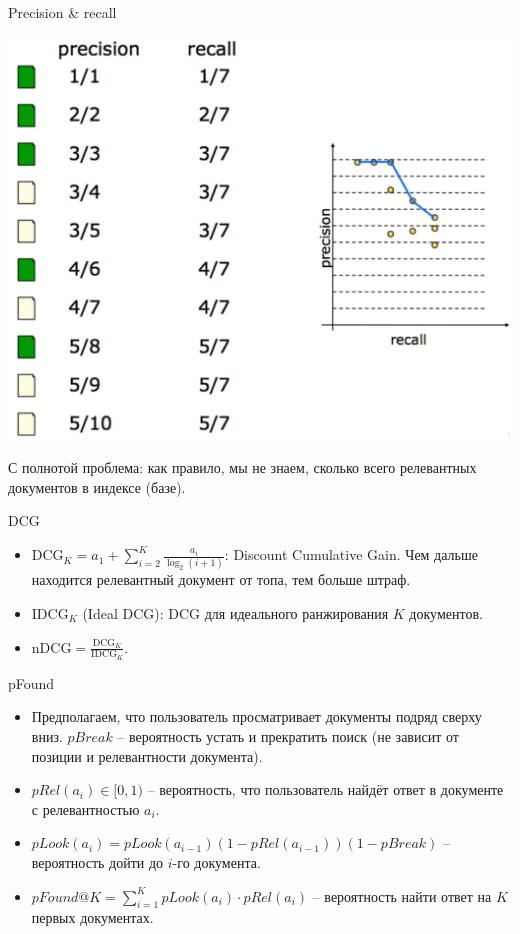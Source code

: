 \documentclass[9pt]{beamer}
\begin{document}
\begin{frame}{Precision \& recall}
\begin{center}
    \includegraphics[height=0.7\textheight]{img/ranking_precision_recall.jpg}
\end{center}
С полнотой проблема: как правило, мы не знаем, сколько всего релевантных документов в индексе (базе).
\end{frame}

\begin{frame}{DCG}
    \begin{itemize}
        \item $\text{DCG}_K = a_1 + \sum_{i=2}^K\frac{a_i}{\log_2(i+1)}$: Discount Cumulative Gain. Чем дальше находится релевантный документ от топа, тем больше штраф.
        \item $\text{IDCG}_K$ (Ideal DCG): DCG для идеального ранжирования $K$ документов.
        \item $\text{nDCG} = \frac{\text{DCG}_K}{\text{IDCG}_K}$.
    \end{itemize}
\end{frame}

\begin{frame}{pFound}
\begin{itemize}
    \item Предполагаем, что пользователь просматривает документы подряд сверху вниз. $pBreak$ -- вероятность устать и прекратить поиск (не зависит от позиции и релевантности документа).
    \item $pRel(a_i) \in [0, 1)$ -- вероятность, что пользователь найдёт ответ в документе с релевантностью $a_i$.
    \item $pLook(a_i) = pLook(a_{i-1})(1-pRel(a_{i-1}))(1-pBreak)$ – вероятность дойти до $i$-го документа.
    \item $pFound@K = \sum_{i=1}^K pLook(a_i) \cdot pRel(a_i)$ – вероятность найти ответ на $K$ первых документах.
\end{itemize}
\end{frame}
\end{document}
